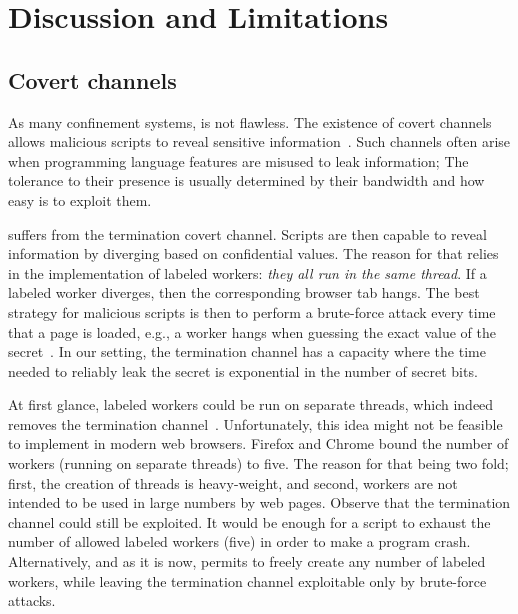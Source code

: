 \section{Discussion and Limitations}
\label{sec:discussion}


\subsection{Covert channels}

As many confinement systems, \sys{} is not flawless. The existence of covert
channels allows malicious scripts to reveal sensitive
information~\cite{lampson:confinement}.  Such channels often arise when
programming language features are misused to leak information; The tolerance to
their presence is usually determined by their bandwidth and how easy is to
exploit them.

\sys{} suffers from the termination covert channel. Scripts are then capable to
reveal information by diverging based on confidential values. The reason for
that relies in the implementation of labeled workers: \emph{they all run in the
  same thread}. If a labeled worker diverges, then the corresponding browser tab
hangs. The best strategy for malicious scripts is then to perform a brute-force
attack every time that a page is loaded, e.g., a worker hangs when guessing the
exact value of the secret~\cite{askarov:termination-insensitive}. In our
setting, the termination channel has a capacity where the time needed to reliably
leak the secret is exponential in the number of secret bits.



At first glance, labeled workers could be run on separate threads, which indeed
removes the termination channel~\cite{stefan:addressing-covert}.  Unfortunately,
this idea might not be feasible to implement in modern web browsers. Firefox and
Chrome bound the number of workers (running on separate threads) to five. The
reason for that being two fold; first, the creation of threads is heavy-weight,
and second, workers are not intended  to be used in large numbers
by web pages. 
Observe that the termination channel could still be exploited.  It would be
enough for a script to exhaust the number of allowed labeled workers (five) in
order to make a program crash.
Alternatively, and as it is now, \sys{}
permits to freely create any number of labeled workers, while leaving the
termination channel exploitable only by brute-force attacks.

